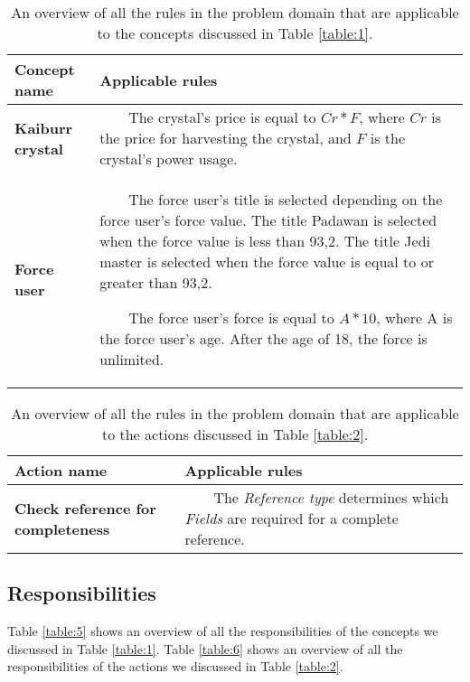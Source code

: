 \documentclass[a4paper]{article}
\newcommand{\tabitem}{~~\llap{\textbullet}~~}
\begin{document}
\begin{table}
	\centering
	\caption{An overview of all the rules in the problem domain that are applicable to the concepts discussed in Table \ref{table:1}.}
	\label{table:3}
	\begin{tabular}{|p{3cm}|p{8.5cm}|} \hline
		\textbf{Concept name} & \textbf{Applicable rules} \\ \hline
		
		\textbf{Kaiburr crystal} & 
			\tabitem The crystal's price is equal to $ Cr * F $, where $ Cr $ is the price for harvesting the crystal, and $ F $ is the crystal's power usage. \\ \hline
		
		\textbf{Force user} &
			\tabitem The force user's title is selected depending on the force user's force value. The title Padawan is selected when the force value is less than 93,2. The title Jedi master is selected when the force value is equal to or greater than 93,2. 
			
			\tabitem The force user's force is equal to $ A * 10 $, where A is the force user's age. After the age of 18, the force is unlimited.\\ \hline
	\end{tabular}
\end{table}

\begin{table}
	\centering
	\caption{An overview of all the rules in the problem domain that are applicable to the actions discussed in Table \ref{table:2}.}
	\label{table:4}
	\begin{tabular}{|p{3cm}|p{8.5cm}|} \hline
		\textbf{Action name} & \textbf{Applicable rules} \\ \hline
		
		\textbf{Check reference for completeness} & 
			\tabitem The \textit{Reference type} determines which \textit{Fields} are required for a complete reference. \\ \hline
	\end{tabular}
\end{table}

\subsection{Responsibilities}
Table \ref{table:5} shows an overview of all the responsibilities of the concepts we discussed in Table \ref{table:1}. Table \ref{table:6} shows an overview of all the responsibilities of the actions we discussed in Table \ref{table:2}.
\end{document}
